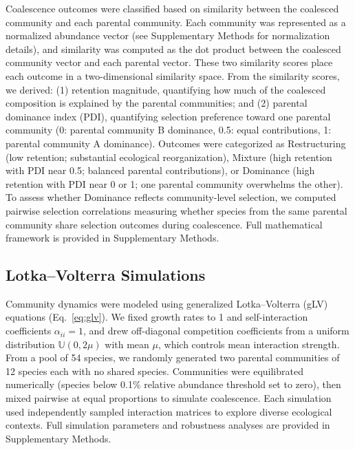 Coalescence outcomes were classified based on similarity between the coalesced community and each parental community. Each community was represented as a normalized abundance vector (see Supplementary Methods for normalization details), and similarity was computed as the dot product between the coalesced community vector and each parental vector. These two similarity scores place each outcome in a two-dimensional similarity space. From the similarity scores, we derived: (1) retention magnitude, quantifying how much of the coalesced composition is explained by the parental communities; and (2) parental dominance index (PDI), quantifying selection preference toward one parental community (0: parental community B dominance, 0.5: equal contributions, 1: parental community A dominance). Outcomes were categorized as Restructuring (low retention; substantial ecological reorganization), Mixture (high retention with PDI near 0.5; balanced parental contributions), or Dominance (high retention with PDI near 0 or 1; one parental community overwhelms the other). To assess whether Dominance reflects community-level selection, we computed pairwise selection correlations measuring whether species from the same parental community share selection outcomes during coalescence. Full mathematical framework is provided in Supplementary Methods.


\subsection*{Lotka--Volterra Simulations}
\label{sec:methods:simulations}

Community dynamics were modeled using generalized Lotka--Volterra (gLV) equations (Eq.~\ref{eq:glv}). We fixed growth rates to 1 and self-interaction coefficients $\alpha_{ii} = 1$, and drew off-diagonal competition coefficients from a uniform distribution $\mathbb{U}(0, 2\mu)$ with mean $\mu$, which controls mean interaction strength. From a pool of 54 species, we randomly generated two parental communities of 12 species each with no shared species. Communities were equilibrated numerically (species below 0.1\% relative abundance threshold set to zero), then mixed pairwise at equal proportions to simulate coalescence. Each simulation used independently sampled interaction matrices to explore diverse ecological contexts. Full simulation parameters and robustness analyses are provided in Supplementary Methods.


